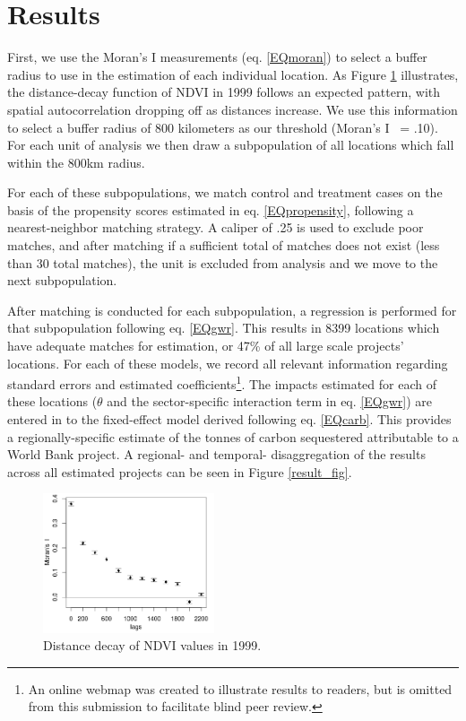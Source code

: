 \documentclass[sustainability,article,submit,moreauthors,pdftex,10pt,a4paper]{mdpi}
\begin{document}
\section{Results}
First, we use the Moran's I measurements (eq. \ref{EQmoran}) to select a buffer radius to use in the estimation of each individual location. As Figure \ref{DDFig} illustrates, the distance-decay function of NDVI in 1999 follows an expected pattern, with spatial autocorrelation dropping off as distances increase. We use this information to select a buffer radius of 800 kilometers as our threshold (Moran's I ~= .10). For each unit of analysis we then draw a subpopulation of all locations which fall within the 800km radius.
\par
For each of these subpopulations, we match control and treatment cases on the basis of the propensity scores estimated in eq. \ref{EQpropensity}, following a nearest-neighbor matching strategy. A caliper of .25 is used to exclude poor matches, and after matching if a sufficient total of matches does not exist (less than 30 total matches), the unit is excluded from analysis and we move to the next subpopulation. 
\par
 After matching is conducted for each subpopulation, a regression is performed for that subpopulation following eq. \ref{EQgwr}. This results in 8399 locations which have adequate matches for estimation, or 47\% of all large scale projects' locations. For each of these models, we record all relevant information regarding standard errors and estimated coefficients\footnote{An online webmap was created to illustrate results to readers, but is omitted from this submission to facilitate blind peer review.}. The impacts estimated for each of these locations (\begin{math}\theta\end{math} and the sector-specific interaction term in eq. \ref{EQgwr}) are entered in to the fixed-effect model derived following eq. \ref{EQcarb}. This provides a regionally-specific estimate of the tonnes of carbon sequestered attributable to a World Bank project. A regional- and temporal- disaggregation of the results across all estimated projects can be seen in Figure \ref{result_fig}.
 
\begin{figure}[H]
\centering
 \includegraphics[width=0.45\textwidth]{pre_avg_NDVI_max_full.png}
\caption{Distance decay of NDVI values in 1999.}
\label{DDFig}
\end{figure}
\end{document}
